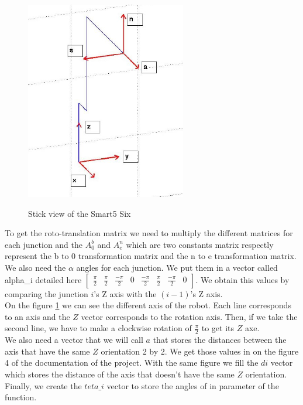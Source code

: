 \documentclass[english,a4paper,11pt]{report}
\begin{document}
	
	\begin{figure} 
		\vspace{-1cm}

 		 \begin{center}
  			\includegraphics[width=7cm]{images_not_compressed/alphaAngles.png}
			\label{alpha}
			\caption{Stick view of the Smart5 Six}
 		 \end{center}
	\end{figure} 
	
	\vspace{1cm}
	
	To get the roto-translation matrix we need to multiply the different matrices for each junction and the $A^{b}_{0}$ and $A^{n}_{e}$ which are two constants matrix respectly represent the b to 0 transformation matrix and the n to e transformation matrix.\\
	We also need the $\alpha$ angles for each junction. We put them in a vector called alpha\_i detailed here $\begin{bmatrix}\frac{\pi}{2} & \frac{\pi}{2} & \frac{-\pi}{2} & 0 & \frac{-\pi}{2} & \frac{\pi}{2} & \frac{-\pi}{2} & 0\end{bmatrix}$. We obtain this values by comparing the junction $i$\rq{}s Z axis with the $(i-1)$\rq{}s Z axis.\\
	On the figure \ref{alpha} we can see the different axis of the robot. Each line corresponds to an axis and the $Z$ vector corresponds to the rotation axis. Then, if we take the second line, we have to make a clockwise rotation of $\frac{\pi}{2}$ to get its $Z$ axe.\\
	We also need a vector that we will call $a$ that stores the distances between the axis that have the same $Z$ orientation 2 by 2. We get those values in on the figure 4 of the documentation of the project. With the same figure we fill the $di$ vector which stores the distance of the axis that doesn\rq{}t have the same $Z$ orientation.
	Finally, we create the $teta\_i$ vector to store the angles of in parameter of the function.
\end{document}
